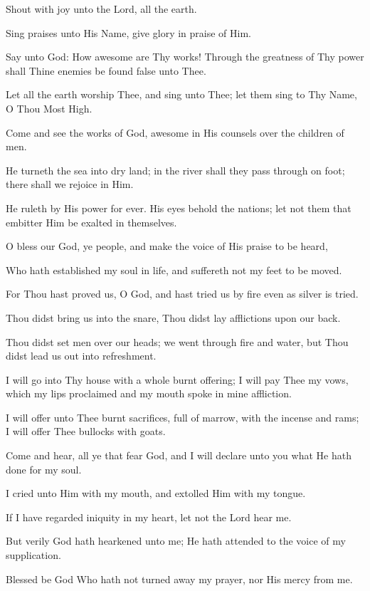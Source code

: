 Shout with joy unto the Lord, all the earth.

Sing praises unto His Name, give glory in praise of Him.

Say unto God: How awesome are Thy works! Through the greatness of Thy power shall Thine enemies be found false unto Thee.

Let all the earth worship Thee, and sing unto Thee; let them sing to Thy Name, O Thou Most High.

Come and see the works of God, awesome in His counsels over the children of men.

He turneth the sea into dry land; in the river shall they pass through on foot; there shall we rejoice in Him.

He ruleth by His power for ever. His eyes behold the nations; let not them that embitter Him be exalted in themselves.

O bless our God, ye people, and make the voice of His praise to be heard,

Who hath established my soul in life, and suffereth not my feet to be moved.

For Thou hast proved us, O God, and hast tried us by fire even as silver is tried.

Thou didst bring us into the snare, Thou didst lay afflictions upon our back.

Thou didst set men over our heads; we went through fire and water, but Thou didst lead us out into refreshment.

I will go into Thy house with a whole burnt offering; I will pay Thee my vows, which my lips proclaimed and my mouth spoke in mine affliction.

I will offer unto Thee burnt sacrifices, full of marrow, with the incense and rams; I will offer Thee bullocks with goats.

Come and hear, all ye that fear God, and I will declare unto you what He hath done for my soul.

I cried unto Him with my mouth, and extolled Him with my tongue.

If I have regarded iniquity in my heart, let not the Lord hear me.

But verily God hath hearkened unto me; He hath attended to the voice of my supplication.

Blessed be God Who hath not turned away my prayer, nor His mercy from me.
